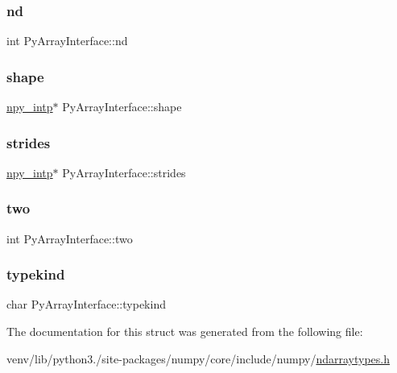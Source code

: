 \subsubsection{\texorpdfstring{nd}{nd}}
{\footnotesize\ttfamily int Py\+Array\+Interface\+::nd}

\mbox{\label{structPyArrayInterface_a4b6a02bad810f02841a2cdf3dee8f40c}} 
\subsubsection{\texorpdfstring{shape}{shape}}
{\footnotesize\ttfamily \hyperlink{npy__common_8h_a2d6effc4d5ecb85675ebfcfaa102b483}{npy\+\_\+intp}$\ast$ Py\+Array\+Interface\+::shape}

\mbox{\label{structPyArrayInterface_ac881f1d31292469ae51a3fbf96fa485d}} 
\subsubsection{\texorpdfstring{strides}{strides}}
{\footnotesize\ttfamily \hyperlink{npy__common_8h_a2d6effc4d5ecb85675ebfcfaa102b483}{npy\+\_\+intp}$\ast$ Py\+Array\+Interface\+::strides}

\mbox{\label{structPyArrayInterface_ab6d24fbafdbe601ef3c77720ffecb470}} 
\subsubsection{\texorpdfstring{two}{two}}
{\footnotesize\ttfamily int Py\+Array\+Interface\+::two}

\mbox{\label{structPyArrayInterface_aae32b9e36b1b8fead0c2f69f2c5b899f}} 
\subsubsection{\texorpdfstring{typekind}{typekind}}
{\footnotesize\ttfamily char Py\+Array\+Interface\+::typekind}



The documentation for this struct was generated from the following file\+:\begin{DoxyCompactItemize}
\item 
venv/lib/python3./site-\/packages/numpy/core/include/numpy/\hyperlink{ndarraytypes_8h}{ndarraytypes.\+h}\end{DoxyCompactItemize}
